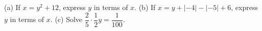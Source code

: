 (a) If $x=y^2+12$, express $y$ in terms of $x$. (b) If $x=y+|-4|-|-5|+6$, express $y$ in terms of $x$. (c) Solve $\dfrac{2}{5}\cdot\dfrac{1}{2}y=\dfrac{1}{100}$.
